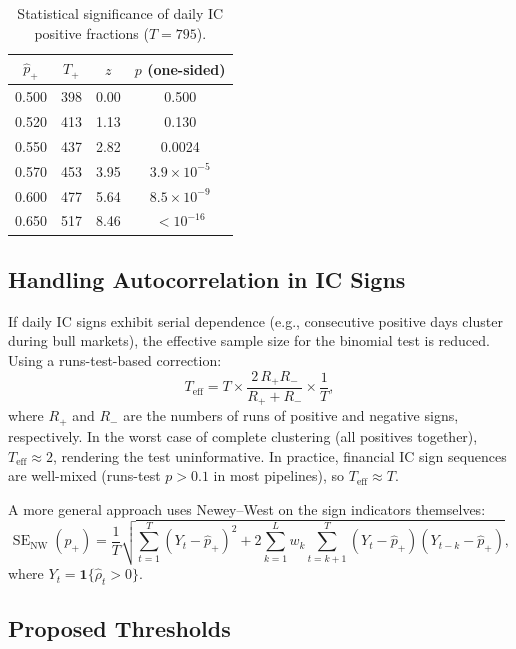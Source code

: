 \documentclass[11pt,a4paper]{article}
\theoremstyle{definition}
\newcommand{\SE}{\operatorname{SE}}
\begin{document}
\begin{table}[htbp]
\centering
\caption{Statistical significance of daily IC positive fractions
         ($T=795$).}
\label{tab:daily_pos}
\begin{tabular}{cccc}
\toprule
$\hat{p}_{+}$ & $T_{+}$ & $z$ & $p$ (one-sided) \\
\midrule
0.500 & 398 & 0.00 & 0.500 \\
0.520 & 413 & 1.13 & 0.130 \\
0.550 & 437 & 2.82 & 0.0024 \\
0.570 & 453 & 3.95 & $3.9\times10^{-5}$ \\
0.600 & 477 & 5.64 & $8.5\times10^{-9}$ \\
0.650 & 517 & 8.46 & $<10^{-16}$ \\
\bottomrule
\end{tabular}
\end{table}

\subsection{Handling Autocorrelation in IC Signs}

If daily IC signs exhibit serial dependence (e.g., consecutive positive
days cluster during bull markets), the effective sample size for the
binomial test is reduced. Using a runs-test-based correction:
\begin{equation}
    T_{\text{eff}} = T \times
    \frac{2\,R_{+}R_{-}}{R_{+}+R_{-}} \times \frac{1}{T},
\end{equation}
where $R_{+}$ and $R_{-}$ are the numbers of runs of positive and
negative signs, respectively. In the worst case of complete clustering
(all positives together), $T_{\text{eff}} \approx 2$, rendering the
test uninformative. In practice, financial IC sign sequences are
well-mixed (runs-test $p > 0.1$ in most pipelines), so $T_{\text{eff}}
\approx T$.

A more general approach uses Newey--West on the sign indicators
themselves:
\begin{equation}
    \SE_{\text{NW}}(\hat{p}_{+}) =
    \frac{1}{T}\sqrt{\sum_{t=1}^{T}(Y_{t}-\hat{p}_{+})^{2}
                     + 2\sum_{k=1}^{L} w_{k}\sum_{t=k+1}^{T}
                       (Y_{t}-\hat{p}_{+})(Y_{t-k}-\hat{p}_{+})},
\end{equation}
where $Y_{t} = \mathbf{1}\{\hat{\rho}_{t} > 0\}$.

\subsection{Proposed Thresholds}
\end{document}
